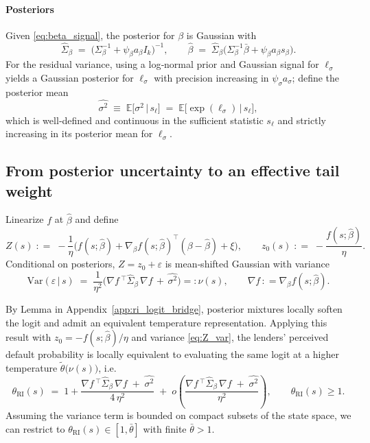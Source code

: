 \documentclass[12pt]{article}
\providecommand{\coloneqq}{\mathrel{\mathop:}=}
\providecommand{\eqqcolon}{=\mathrel{\mathop:}}
\theoremstyle{plain}
\newcommand{\E}{\mathbb{E}}
\newcommand{\Var}{\mathrm{Var}}
\begin{document}
\paragraph{Posteriors}
Given \eqref{eq:beta_signal}, the posterior for $\beta$ is Gaussian with
\begin{equation}\label{eq:beta_posterior}
	\hat\Sigma_\beta\;=\;\big(\Sigma_\beta^{-1}+\psi_\beta a_\beta I_k\big)^{-1},\qquad \hat\beta\;=\;\hat\Sigma_\beta\big(\Sigma_\beta^{-1}\bar\beta+\psi_\beta a_\beta s_\beta\big).
\end{equation}
For the residual variance, using a log‑normal prior and Gaussian signal for $\ell_\sigma$ yields a Gaussian posterior for $\ell_\sigma$ with precision increasing in $\psi_\sigma a_\sigma$; define the posterior mean
\begin{equation}\label{eq:sigma_post_mean}
	\widehat{\sigma^2}\;\equiv\;\E\big[\sigma^2\,\big|\,s_{\ell}\big]\;=\;\E\big[\exp(\ell_\sigma)\,\big|\,s_{\ell}\big],
\end{equation}
which is well‑defined and continuous in the sufficient statistic $s_{\ell}$ and strictly increasing in its posterior mean for $\ell_\sigma$.

\subsection{From posterior uncertainty to an effective tail weight}
Linearize $f$ at $\hat\beta$ and define
\begin{equation}\label{eq:Z_def}
	Z(s)\;\coloneqq\;-\frac{1}{\eta}\Big( f(s;\hat\beta)+\nabla_\beta f(s;\hat\beta)^\top(\beta-\hat\beta)+\xi\Big),\qquad z_0(s)\;\coloneqq\;-\frac{f(s;\hat\beta)}{\eta}.
\end{equation}
Conditional on posteriors, $Z=z_0+\varepsilon$ is mean‑shifted Gaussian with variance
\begin{equation}\label{eq:Z_var}
	\Var(\varepsilon\,|\,s)\;=\;\frac{1}{\eta^2}\Big(\nabla f\,^\top\hat\Sigma_\beta\,\nabla f\,+\,\widehat{\sigma^2}\Big)\eqqcolon\nu(s),\qquad \nabla f\,\coloneqq\nabla_\beta f(s;\hat\beta).
\end{equation}

By Lemma in Appendix~\ref{app:ri_logit_bridge}, posterior mixtures locally
soften the logit and admit an equivalent temperature representation. Applying
this result with $z_0=-f(s;\hat\beta)/\eta$ and variance \eqref{eq:Z_var}, the
lenders’ perceived default probability is locally equivalent to evaluating the
same logit at a higher temperature $\tilde\theta\big(\nu(s)\big)$, i.e.
\begin{equation}\label{eq:theta_RI_def}
	\theta_{\mathrm{RI}}(s)\;=\;1+\frac{\nabla f\,^\top\hat\Sigma_\beta\,\nabla f\;+\;\widehat{\sigma^2}}{4\,\eta^2}\;+\;o\!\left(\frac{\nabla f\,^\top\hat\Sigma_\beta\,\nabla f\;+\;\widehat{\sigma^2}}{\eta^2}\right),\qquad \theta_{\mathrm{RI}}(s)\ge 1.
\end{equation}
Assuming the variance term is bounded on compact subsets of the state space, we can restrict to $\theta_{\mathrm{RI}}(s)\in[1,\bar\theta]$ with finite $\bar\theta>1$.
\end{document}
